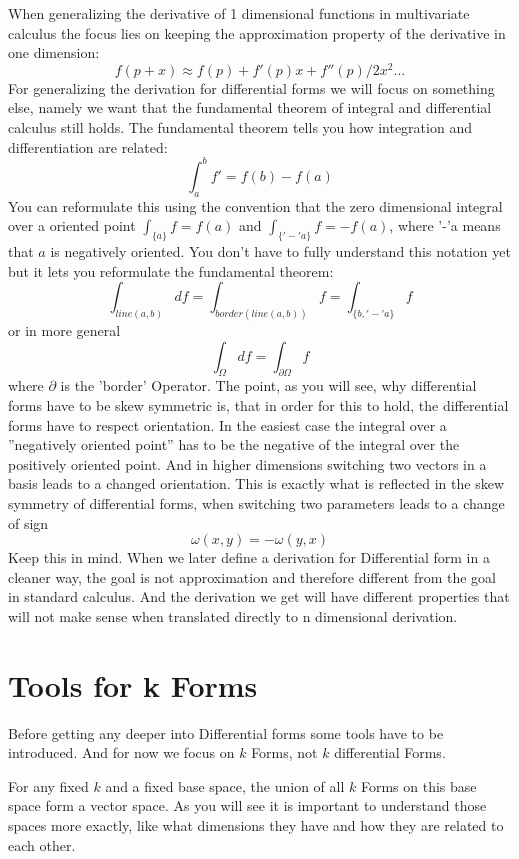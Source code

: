 When generalizing the derivative of 1 dimensional functions in multivariate calculus the focus lies on keeping the approximation property of the derivative in one dimension:
\[f(p+x) \approx f(p) + f'(p)x + f''(p)/2 x^2 ...\]
For generalizing the derivation for differential forms we will focus on something else, namely we want that the fundamental theorem of integral and differential calculus still holds. The fundamental theorem tells you how integration and differentiation are related:
\[\int_a^b f' = f(b) - f(a)\]
You can reformulate this using the convention that the zero dimensional integral over a oriented point  $\int_{\{a\}} f = f(a)$ and  $\int_{\{'-'a\}} f = -f(a)$, where '-'a means that $a$ is negatively oriented. You don't have to fully understand this notation yet but it lets you reformulate the fundamental theorem:
\[\int_{line(a,b)} df = \int_{border(line(a,b))} f = \int_{\{b,'-'a\}} f\]
or in more general
\[\int_{\Omega} df = \int_{\partial \Omega} f\]
where $\partial$ is the 'border' Operator. The point, as you will see, why differential forms have to be skew symmetric is, that in order for this to hold, the differential forms have to respect orientation. In the easiest case the integral over a ''negatively oriented point'' has to be the negative of the integral over the positively oriented point. And in higher dimensions switching two vectors in a basis leads to a changed orientation. This is exactly what is reflected in the skew symmetry of differential forms, when switching two parameters leads to a change of sign
\[\omega(x,y) = -\omega(y,x)\]
Keep this in mind. When we later define a derivation for Differential form in a cleaner way, the goal is not approximation and therefore different from the goal in standard calculus. And the derivation we get will have different properties that will not make sense when translated directly to n dimensional derivation.

\section{Tools for k Forms}

Before getting any deeper into Differential forms some tools have to be introduced. And for now we focus on $k$ Forms, not $k$ differential Forms. 

For any fixed $k$ and a fixed base space, the union of all $k$ Forms on this base space form a vector space. As you will see it is important to understand those spaces more exactly, like what dimensions they have and how they are related to each other.

